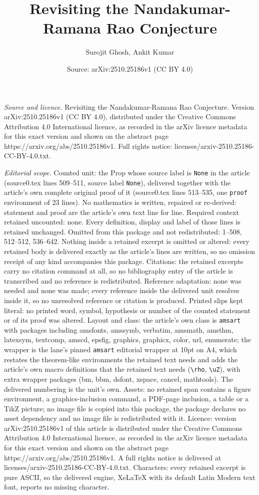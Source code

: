 \documentclass[10pt,a4paper]{amsart}
\title[Revisiting the Nandakumar-Ramana Rao Conjecture]{Revisiting the Nandakumar-Ramana Rao Conjecture}
\author{Surojit Ghosh, Ankit Kumar}
\date{Source: arXiv:2510.25186v1 (CC BY 4.0)}
\begin{document}
\maketitle

\noindent\emph{Source and licence.} Revisiting the Nandakumar-Ramana Rao Conjecture. Version arXiv:2510.25186v1 (CC BY 4.0), distributed under the Creative Commons Attribution 4.0 International licence, as recorded in the arXiv licence metadata for this exact version and shown on the abstract page https://arxiv.org/abs/2510.25186v1. Full rights notice: licenses/arxiv-2510.25186-CC-BY-4.0.txt.\par\smallskip

\noindent\textit{Editorial scope.} Counted unit: the Prop whose source label is \texttt{None} in the article (source0.tex lines 509--511, source label \texttt{None}), delivered together with the article's own complete original proof of it (source0.tex lines 513--535, one \texttt{proof} environment of 23 lines). No mathematics is written, repaired or re-derived: statement and proof are the article's own text line for line. Required context retained uncounted: none. Every definition, display and label of those lines is retained unchanged. Omitted from this package and not redistributed: 1--508, 512--512, 536--642. Nothing inside a retained excerpt is omitted or altered: every retained body is delivered exactly as the article's lines are written, so no omission receipt of any kind accompanies this package. Citations: the retained excerpts carry no citation command at all, so no bibliography entry of the article is transcribed and no reference is redistributed. Reference adaptation: none was needed and none was made; every reference inside the delivered unit resolves inside it, so no unresolved reference or citation is produced. Printed slips kept literal: no printed word, symbol, hypothesis or number of the counted statement or of its proof was altered. Layout and class: the article's own class is \texttt{amsart} with packages including amsfonts, amssymb, verbatim, amsmath, amsthm, latexsym, textcomp, amscd, epsfig, graphics, graphicx, color, url, enumerate; the wrapper is the lane's pinned \texttt{amsart} editorial wrapper at 10pt on A4, which restates the theorem-like environments the retained text needs and adds the article's own macro definitions that the retained text needs (\texttt{\textbackslash rho}, \texttt{\textbackslash uZ}), with extra wrapper packages (bm, bbm, dsfont, xspace, cancel, mathtools). The delivered numbering is the unit's own. Assets: no retained span contains a figure environment, a graphics-inclusion command, a PDF-page inclusion, a table or a TikZ picture; no image file is copied into this package, the package declares no asset dependency and no image file is redistributed with it. Licence: version arXiv:2510.25186v1 of this article is distributed under the Creative Commons Attribution 4.0 International licence, as recorded in the arXiv licence metadata for this exact version and shown on the abstract page https://arxiv.org/abs/2510.25186v1. A full rights notice is delivered at licenses/arxiv-2510.25186-CC-BY-4.0.txt. Characters: every retained excerpt is pure ASCII, so the delivered engine, XeLaTeX with its default Latin Modern text font, reports no missing character.
\end{document}
